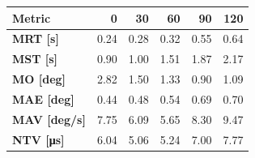 \begin{tabular*}{\textwidth}{@{\extracolsep{\fill}}l|rrrrr}
    \toprule
    \textbf{Metric} & \textbf{0} & \textbf{30} & \textbf{60} & \textbf{90} & \textbf{120} \\
    \midrule
    \textbf{MRT [s]} & 0.24 & 0.28 & 0.32 & 0.55 & 0.64 \\
    \textbf{MST [s]} & 0.90 & 1.00 & 1.51 & 1.87 & 2.17 \\
    \textbf{MO  [deg]} & 2.82 & 1.50 & 1.33 & 0.90 & 1.09 \\
    \textbf{MAE [deg]} & 0.44 & 0.48 & 0.54 & 0.69 & 0.70 \\
    \textbf{MAV [deg/s]} & 7.75 & 6.09 & 5.65 & 8.30 & 9.47 \\
    \textbf{NTV [\si{\micro\second}]} & 6.04 & 5.06 & 5.24 & 7.00 & 7.77 \\
    \bottomrule
\end{tabular*}

